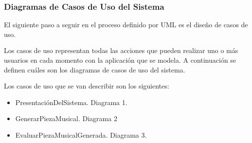 \subsubsection{Diagramas de Casos de Uso del Sistema}

El siguiente paso a seguir en el proceso definido por UML es el diseño de casos de uso.

Los casos de uso representan todas las acciones que pueden realizar uno o más usuarios en cada momento con la aplicación que se modela. A continuación se definen cuáles son los diagramas de casos de uso del sistema.

Los casos de uso que se van describir son los siguientes:


\begin{itemize}

    \item PresentaciónDelSistema. Diagrama 1.

    \item GenerarPiezaMusical. Diagrama 2

    \item EvaluarPiezaMusicalGenerada. Diagrama 3.

\end{itemize}

